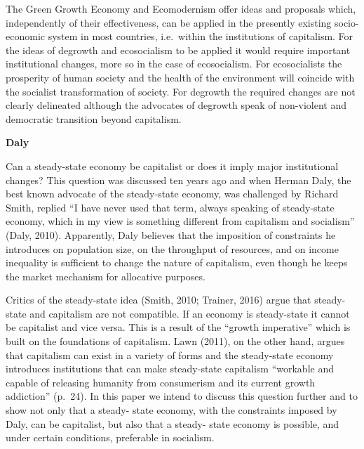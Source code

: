 \documentclass[
]{book}
\begin{document}
The Green Growth Economy and Ecomodernism offer ideas and proposals which,
independently of their effectiveness, can be applied in the presently existing socio-economic
system in most countries, i.e.~within the institutions of capitalism. For the ideas of degrowth
and ecosocialism to be applied it would require important institutional changes, more so in the
case of ecosocialism. For ecosocialists the prosperity of human society and the health of the
environment will coincide with the socialist transformation of society. For degrowth the
required changes are not clearly delineated although the advocates of degrowth speak of
non-violent and democratic transition beyond capitalism.

\textbf{Daly}

Can a steady-state economy be capitalist
or does it imply major institutional changes? This question was discussed ten years ago and
when Herman Daly, the best known advocate of the steady-state economy, was challenged
by Richard Smith, replied ``I have never used that term, always speaking of steady-state
economy, which in my view is something different from capitalism and socialism'' (Daly,
2010). Apparently, Daly believes that the imposition of constraints he introduces on
population size, on the throughput of resources, and on income inequality is sufficient to change the nature of capitalism, even though he keeps the market mechanism for allocative purposes.

Critics of the steady-state idea (Smith, 2010; Trainer, 2016) argue that steady-state and
capitalism are not compatible. If an economy is steady-state it cannot be capitalist and vice
versa. This is a result of the ``growth imperative'' which is built on the foundations of
capitalism. Lawn (2011), on the other hand, argues that capitalism can exist in a variety of
forms and the steady-state economy introduces institutions that can make steady-state
capitalism ``workable and capable of releasing humanity from consumerism and its current
growth addiction'' (p.~24).
In this paper we intend to discuss this question further and to show not only that a steady-
state economy, with the constraints imposed by Daly, can be capitalist, but also that a steady-
state economy is possible, and under certain conditions, preferable in socialism.
\end{document}
